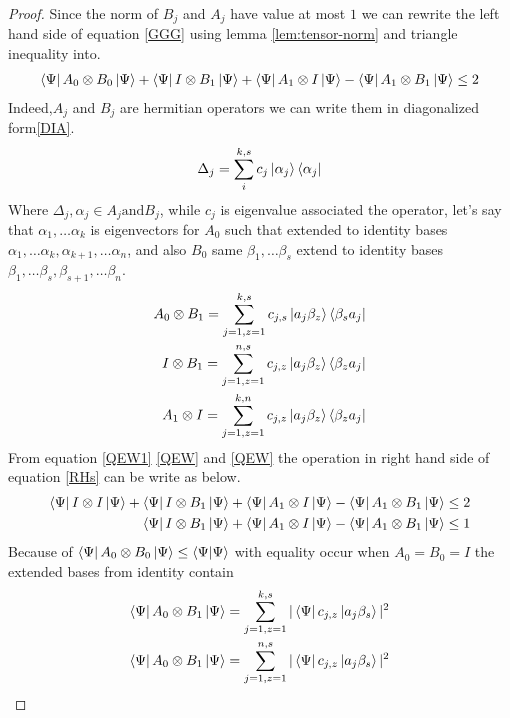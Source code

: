\begin{proof}

Since the norm of $B_j$ and $A_j$  have value  at most $1$ we can rewrite the left hand side of equation  \ref{GGG} using lemma \ref{lem:tensor-norm}  and triangle inequality into. 
\begin{align}\label{RHs}
 \bra{\Psi}A_0\otimes B_0\ket{\Psi}+ \bra{\Psi} I\otimes B_1\ket{\Psi}+ \bra{\Psi}A_1\otimes I\ket{\Psi}-  \bra{\Psi}A_1\otimes B_1 \ket{\Psi} \leq 2
\end{align}
 Indeed,$A_j$ and $B_j$ are hermitian operators we can write them in diagonalized form\ref{DIA}. 
$$\Delta_{j}=\sum_{i}^{k,s}c_j \ket{\alpha_j}\bra{\alpha_j}$$
Where $\Delta_{j},\alpha_j \in A_j \text{and} B_j$, while $c_j$ is eigenvalue associated the operator, let's say that  $\alpha_1,\dots \alpha_k$ is eigenvectors for $A_0$ such that extended to identity bases $\alpha_1,\dots \alpha_k,\alpha_{k+1},\dots \alpha_{n}$,
and also  $B_0$ same $\beta_1,\dots \beta_s$ extend to identity bases $\beta_1,\dots \beta_s,\beta_{s+1},\dots \beta_n$. 
\begin{align}
A_0 \otimes B_1=\sum_{j=1,z=1}^{k,s}c_{j,s}\ket{a_j\beta _z} \bra{\beta_s a_j }\label{QEW}\\
I \otimes B_1=\sum_{j=1,z=1}^{n,s}c_{j,z}\ket{a_j\beta _z} \bra{\beta_z a_j }\label{QEW1}\\
A_1 \otimes I=\sum_{j=1,z=1}^{k,n}c_{j,z}\ket{a_j\beta _z} \bra{\beta_z a_j }\label{QEW2}
\end{align}
From equation \ref{QEW1}  \ref{QEW} and \ref{QEW} the operation in right hand  side of  equation  \ref{RHs} can be write as below.
\begin{align}\label{NAND:TINEQ}
\bra{\Psi} I\otimes I\ket{\Psi}+\bra{\Psi}I\otimes B_1\ket{\Psi}+\bra{\Psi}A_1\otimes I\ket{\Psi}-\bra{\Psi}A_1\otimes B_1 \ket{\Psi} \leq 2\\
\bra{\Psi}I\otimes B_1\ket{\Psi}+\bra{\Psi}A_1\otimes I\ket{\Psi}-\bra{\Psi}A_1\otimes B_1 \ket{\Psi} \leq 1
\end{align}
Because of $\bra{\Psi} A_0\otimes B_0\ket{\Psi} \leq \bra {\Psi} \ket{\Psi}$ with equality occur when $A_0=B_0=I$ the extended bases from identity contain  
\begin{align*}
\bra{\Psi} A_0\otimes B_1\ket{\Psi}=\sum_{j=1,z=1}^{k,s}|\bra{\Psi}c_{j,z}\ket{a_j\beta _s}|^2\\
\bra{\Psi} A_0\otimes B_1\ket{\Psi}=\sum_{j=1,z=1}^{n,s}|\bra{\Psi}c_{j,z}\ket{a_j\beta _s}|^2
\end{align*}


\end{proof}
